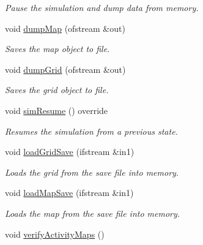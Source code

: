 \begin{DoxyCompactItemize}
\begin{DoxyCompactList}\small\item\em Pause the simulation and dump data from memory. \end{DoxyCompactList}\item 
void \hyperlink{class_spatial_tree_ab239652fcda3b0287e7c2ee29afde3b1}{dump\+Map} (ofstream \&out)
\begin{DoxyCompactList}\small\item\em Saves the map object to file. \end{DoxyCompactList}\item 
void \hyperlink{class_spatial_tree_aad249642767366c7df4cc2bae3c65987}{dump\+Grid} (ofstream \&out)
\begin{DoxyCompactList}\small\item\em Saves the grid object to file. \end{DoxyCompactList}\item 
void \hyperlink{class_spatial_tree_ad578ceeaf0ab3f4a2e39eb907881c11f}{sim\+Resume} () override
\begin{DoxyCompactList}\small\item\em Resumes the simulation from a previous state. \end{DoxyCompactList}\item 
void \hyperlink{class_spatial_tree_a2ab187d381811c7c7640a7cc4607c437}{load\+Grid\+Save} (ifstream \&in1)
\begin{DoxyCompactList}\small\item\em Loads the grid from the save file into memory. \end{DoxyCompactList}\item 
void \hyperlink{class_spatial_tree_a85304af0df40187aedc4c81a53ffde8c}{load\+Map\+Save} (ifstream \&in1)
\begin{DoxyCompactList}\small\item\em Loads the map from the save file into memory. \end{DoxyCompactList}\item 
void \hyperlink{class_spatial_tree_af2fe54f787584c4fde048ebc96556a51}{verify\+Activity\+Maps} ()\hypertarget{class_spatial_tree_af2fe54f787584c4fde048ebc96556a51}{}\label{class_spatial_tree_af2fe54f787584c4fde048ebc96556a51}


\end{DoxyCompactItemize}

